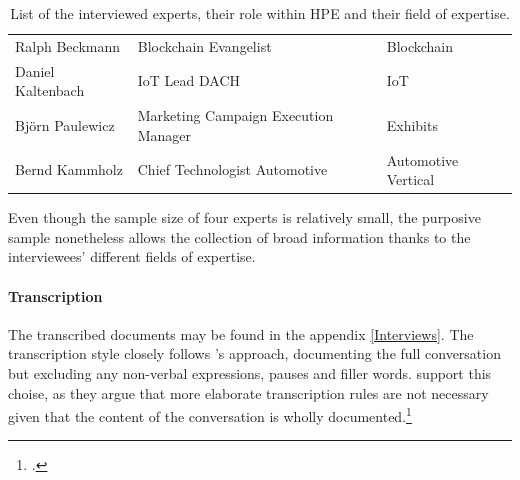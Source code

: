 \begin{table}[]  
    \centering
    \begin{tabular}{l|l|l}
        Ralph Beckmann & Blockchain Evangelist & Blockchain \\
        Daniel Kaltenbach & IoT Lead DACH & IoT \\
        Björn Paulewicz & Marketing Campaign Execution Manager & Exhibits \\
        Bernd Kammholz & Chief Technologist Automotive & Automotive Vertical \\
    \end{tabular}
    \caption{List of the interviewed experts, their role within HPE and their field of expertise.}
    \label{tab:Experts}
\end{table}

Even though the sample size of four experts is relatively small, the purposive sample nonetheless allows the collection of broad information thanks to the interviewees' different fields of expertise. 

\paragraph{Transcription} The transcribed documents may be found in the appendix \ref{Interviews}. The transcription style closely follows \cite{KrugerqualitativeInhaltsanalyseMethode2004}'s approach, documenting the full conversation but excluding any non-verbal expressions, pauses and filler words. \cite{MeuserExpertInneninterviewsvielfacherprobt1991} support this choise, as they argue that more elaborate transcription rules are not necessary given that the content of the conversation is wholly documented.\footcite[Cf.][p.456]{MeuserExpertInneninterviewsvielfacherprobt1991}


